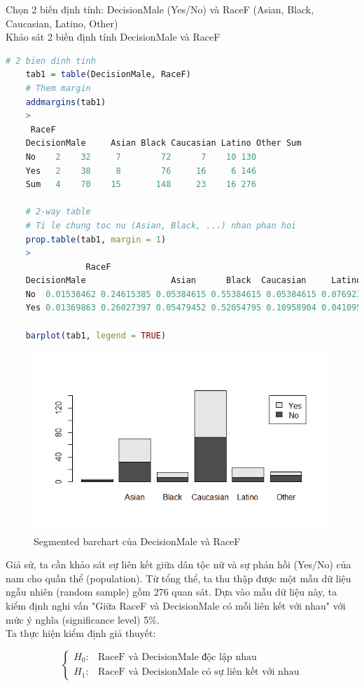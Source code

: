 \documentclass[a4paper,12pt]{article}
\begin{document}
	Chọn 2 biến định tính: DecisionMale (Yes/No) và RaceF (Asian, Black, Caucasian, Latino, Other)\\
	
	Khảo sát 2 biến định tính DecisionMale và RaceF
	
	\begin{lstlisting}[language=R]
	# 2 bien dinh tinh
	tab1 = table(DecisionMale, RaceF)
	# Them margin
	addmargins(tab1)
	>
	 RaceF
	DecisionMale     Asian Black Caucasian Latino Other Sum
	No    2    32     7        72      7    10 130
	Yes   2    38     8        76     16     6 146
	Sum   4    70    15       148     23    16 276
	
	# 2-way table
	# Ti le chung toc nu (Asian, Black, ...) nhan phan hoi
	prop.table(tab1, margin = 1)
	>
	            RaceF
	DecisionMale                 Asian      Black  Caucasian     Latino      Other
	No  0.01538462 0.24615385 0.05384615 0.55384615 0.05384615 0.07692308
	Yes 0.01369863 0.26027397 0.05479452 0.52054795 0.10958904 0.04109589
	
	barplot(tab1, legend = TRUE)
	\end{lstlisting}
	\begin{figure}[H]
		\centering
		\includegraphics[width=0.7\linewidth]{segmented_barchart}
		\caption{Segmented barchart của DecisionMale và RaceF}
		\label{fig:barchart}
	\end{figure}
	
	Giả sử, ta cần khảo sát sự liên kết giữa dân tộc nữ và sự phản hồi (Yes/No) của nam cho quần thể (population). Từ tổng thể, ta thu thập được một mẫu dữ liệu ngẫu nhiên (random sample) gồm 276 quan sát. Dựa vào mẫu dữ liệu này, ta kiểm định nghi vấn "Giữa RaceF và DecisionMale có mỗi liên kết với nhau" với mức ý nghĩa (significance level) 5\%.\\
	
	Ta thực hiện kiểm định giả thuyết:
	
	\begin{equation*}
	\begin{cases}
	H_0: & \text{RaceF và DecisionMale độc lập nhau}\\
	H_1: & \text{RaceF và DecisionMale có sự liên kết với nhau}
	\end{cases}
	\end{equation*}
	
\end{document}
